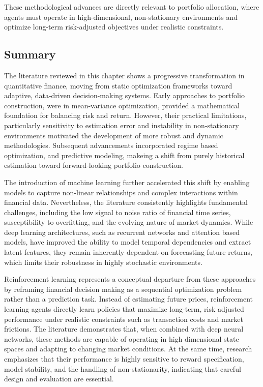 \documentclass[]{elsarticle}
\begin{document}
These methodological advances are directly relevant to portfolio allocation, where agents must operate in high-dimensional, non-stationary environments and optimize long-term risk-adjusted objectives under realistic constraints.

\hypertarget{literature-summary}{%
\subsection{Summary}\label{literature-summary}}

The literature reviewed in this chapter shows a progressive transformation in quantitative finance, moving from static optimization frameworks toward adaptive, data-driven decision-making systems. Early approaches to portfolio construction, were in mean-variance optimization, provided a mathematical foundation for balancing risk and return. However, their practical limitations, particularly sensitivity to estimation error and instability in non-stationary environments motivated the development of more robust and dynamic methodologies. Subsequent advancements incorporated regime based optimization, and predictive modeling, makeing a shift from purely historical estimation toward forward-looking portfolio construction.

The introduction of machine learning further accelerated this shift by enabling models to capture non-linear relationships and complex interactions within financial data. Nevertheless, the literature consistently highlights fundamental challenges, including the low signal to noise ratio of financial time series, susceptibility to overfitting, and the evolving nature of market dynamics. While deep learning architectures, such as recurrent networks and attention based models, have improved the ability to model temporal dependencies and extract latent features, they remain inherently dependent on forecasting future returns, which limits their robustness in highly stochastic environments.

Reinforcement learning represents a conceptual departure from these approaches by reframing financial decision making as a sequential optimization problem rather than a prediction task. Instead of estimating future prices, reinforcement learning agents directly learn policies that maximize long-term, risk adjusted performance under realistic constraints such as transaction costs and market frictions. The literature demonstrates that, when combined with deep neural networks, these methods are capable of operating in high dimensional state spaces and adapting to changing market conditions. At the same time, research emphasizes that their performance is highly sensitive to reward specification, model stability, and the handling of non-stationarity, indicating that careful design and evaluation are essential.
\end{document}
